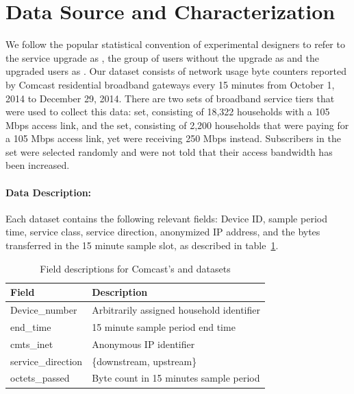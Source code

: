 \section{Data Source and Characterization}\label{sec:data}

We follow the popular statistical convention of experimental designers to 
refer to the service upgrade as \factor{}, the group of users without the 
upgrade as \control{} and the upgraded users as \treatment{} 
\cite{stats-design}. Our dataset consists of network usage byte counters 
reported by Comcast residential broadband gateways every 15 minutes from October 
1, 2014 to December 29, 2014. There are two sets of broadband service tiers that 
were used to collect this data: \control{} set, consisting of 
18,322 households with a 105 Mbps access link, and the 
\treatment{} set, consisting of 2,200 households that were 
paying for a 105 Mbps access link, yet were receiving 250 Mbps instead. 
Subscribers in the \treatment{} set were selected randomly and were not told 
that their access bandwidth has been increased.


\paragraph{Data Description: }Each dataset contains the following relevant 
fields: Device ID, sample period time, service class, service direction, 
anonymized IP address, and the bytes transferred in the 15 minute sample slot, 
as described in table~\ref{tab:field-description}.

\begin{table}[t]
\small
\begin{tabular}{ l l }
\hline
\textbf{Field}         & \textbf{Description}				\\\hline
Device\_number         & Arbitrarily assigned household identifier	\\
end\_time              & 15 minute sample period end time		\\
cmts\_inet             & Anonymous IP identifier			\\
service\_direction     & \{downstream, upstream\}                 	\\
octets\_passed         & Byte count in 15 minutes sample period		\\\hline
\end{tabular}
\caption{Field descriptions for Comcast's \control{} and \treatment{} datasets}
\label{tab:field-description}
\end{table}



